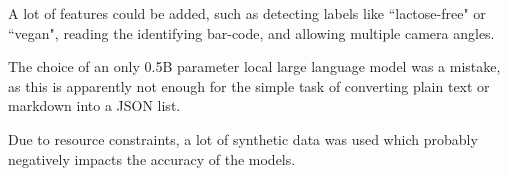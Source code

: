 \documentclass[a4paper,11pt]{report}
\begin{document}
            A lot of features could be added, such as detecting labels like ``lactose-free" or ``vegan", reading the identifying bar-code, and allowing multiple camera angles.
            
            The choice of an only 0.5B parameter local large language model was a mistake, as this is apparently not enough for the simple task of converting plain text or markdown into a JSON list.
            
            Due to resource constraints, a lot of synthetic data was used which probably negatively impacts the accuracy of the models.
        


    \printbibliography[heading=bibintoc]
\end{document}
